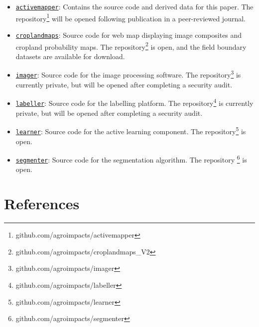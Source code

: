 \documentclass[
  11pt,
  a4paper]{article}
\providecommand{\tightlist}{%
  \setlength{\itemsep}{0pt}\setlength{\parskip}{0pt}}
\begin{document}
\begin{itemize}
\tightlist
\item
  \href{https://github.com/agroimpacts/activemapper}{\texttt{activemapper}}:
  Contains the source code and derived data for this paper. The
  repository\footnote{github.com/agroimpacts/activemapper} will be
  opened following publication in a peer-reviewed journal.
\item
  \href{https://github.com/agroimpacts/croplandmaps_V2}{\texttt{croplandmaps}}:
  Source code for web map displaying image composites and cropland
  probability maps. The
  repository\footnote{github.com/agroimpacts/croplandmaps\_V2} is open,
  and the field boundary datasets are available for download.
\item
  \href{https:github.com/agroimpacts/imager}{\texttt{imager}}: Source
  code for the image processing software. The
  repository\footnote{github.com/agroimpacts/imager} is currently
  private, but will be opened after completing a security audit.
\item
  \href{https:github.com/agroimpacts/labeller}{\texttt{labeller}}:
  Source code for the labelling platform. The
  repository\footnote{github.com/agroimpacts/labeller} is currently
  private, but will be opened after completing a security audit.
\item
  \href{https:github.com/agroimpacts/learner}{\texttt{learner}}: Source
  code for the active learning component. The
  repository\footnote{github.com/agroimpacts/learner} is open.
\item
  \href{https:github.com/agroimpacts/segmenter}{\texttt{segmenter}}:
  Source code for the segmentation algorithm. The repository
  \footnote{github.com/agroimpacts/segmenter} is open.
\end{itemize}

\clearpage

\hypertarget{references}{%
\section{References}\label{references}}

\singlespace
\end{document}

